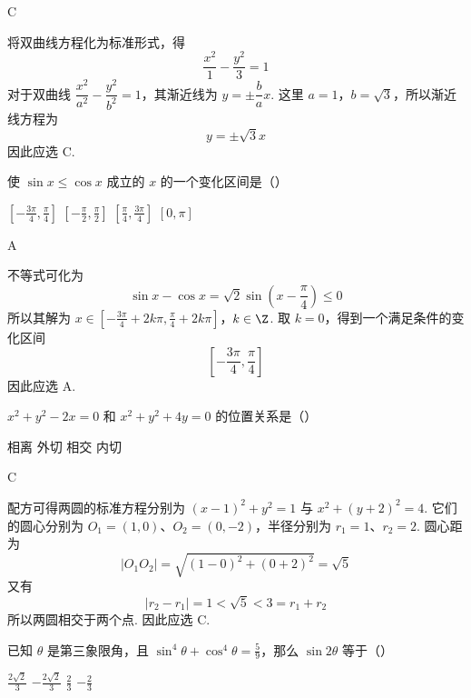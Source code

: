 \begin{answer}
C
\end{answer}

\begin{solution}
将双曲线方程化为标准形式，得
\[
\frac{x^2}{1}-\frac{y^2}{3}=1
\]
对于双曲线 \(\dfrac{x^2}{a^2}-\dfrac{y^2}{b^2}=1\)，其渐近线为 \(y=\pm\dfrac{b}{a}x\). 这里 \(a=1\)，\(b=\sqrt3\)，所以渐近线方程为
\[
y=\pm\sqrt3 x
\]
因此应选 C.
\end{solution}

\begin{problem}
使 \(\sin x \leqslant \cos x\) 成立的 \(x\) 的一个变化区间是（\quad）

\choices
    {\(\left[-\frac{3\pi}{4}, \frac{\pi}{4}\right]\)}
    {\(\left[-\frac{\pi}{2}, \frac{\pi}{2}\right]\)}
    {\(\left[\frac{\pi}{4}, \frac{3\pi}{4}\right]\)}
    {\([0, \pi]\)}
\end{problem}

\begin{answer}
A
\end{answer}

\begin{solution}
不等式可化为
\[
\sin x-\cos x=\sqrt2\sin\left(x-\frac{\pi}{4}\right)\leqslant0
\]
所以其解为
\(x\in\left[-\frac{3\pi}{4}+2k\pi,\frac{\pi}{4}+2k\pi\right]\)，\(k\in\Z\).
取 \(k=0\)，得到一个满足条件的变化区间
\[
\left[-\frac{3\pi}{4},\frac{\pi}{4}\right]
\]
因此应选 A.
\end{solution}

\begin{problem}
\(x^{2} + y^{2} - 2x = 0\) 和 \(x^{2} + y^{2} + 4y = 0\) 的位置关系是（\quad）

\choices
    {相离}
    {外切}
    {相交}
    {内切}
\end{problem}

\begin{answer}
C
\end{answer}

\begin{solution}
配方可得两圆的标准方程分别为 \((x-1)^2+y^2=1\) 与 \(x^2+(y+2)^2=4\).
它们的圆心分别为 \(O_1=(1,0)\)、\(O_2=(0,-2)\)，半径分别为 \(r_1=1\)、\(r_2=2\). 圆心距为
\[
|O_1O_2|=\sqrt{(1-0)^2+(0+2)^2}=\sqrt5
\]
又有
\[
|r_2-r_1|=1<\sqrt5<3=r_1+r_2
\]
所以两圆相交于两个点. 因此应选 C.
\end{solution}

\begin{problem}
已知 \(\theta\) 是第三象限角，且 \(\sin^4\theta + \cos^4\theta = \frac{5}{9}\)，那么 \(\sin 2\theta\) 等于（\quad）

\choices
    {\(\frac{2\sqrt{2}}{3}\)}
    {\(-\frac{2\sqrt{2}}{3}\)}
    {\(\frac{2}{3} \)}
    {\(-\frac{2}{3}\)}
\end{problem}

